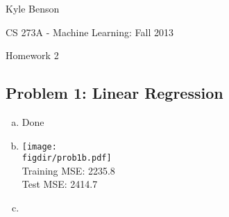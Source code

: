 \documentclass[twoside,11pt]{article}
\newcommand{\figdir}{figs}
\theoremstyle{definition}
\begin{document}
\centerline{\Large Kyle Benson}
\centerline{CS 273A - Machine Learning: Fall 2013}
\centerline{Homework 2}

\subsection*{Problem 1: Linear Regression}

\begin{enumerate}[(a)]
\item Done
\item \vspace{-1in}
\texttt{[image: \\figdir/prob1b.pdf]} \\
Training MSE: 2235.8 \\
Test MSE: 2414.7

\item 

\end{enumerate}
\end{document}
